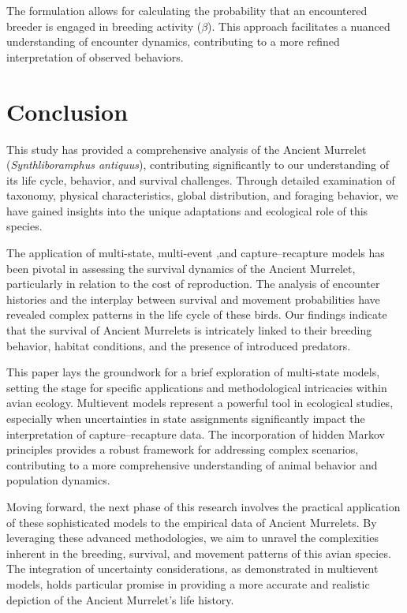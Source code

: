 \documentclass{article}
\begin{document}
The formulation allows for calculating the probability that an encountered breeder is engaged in breeding activity ($\beta$). This approach facilitates a nuanced understanding of encounter dynamics, contributing to a more refined interpretation of observed behaviors.



\section{Conclusion}
This study has provided a comprehensive analysis of the Ancient Murrelet (\textit{Synthliboramphus antiquus}), contributing significantly to our understanding of its life cycle, behavior, and survival challenges. Through detailed examination of taxonomy, physical characteristics, global distribution, and foraging behavior, we have gained insights into the unique adaptations and ecological role of this species.

The application of multi-state, multi-event ,and capture–recapture models has been pivotal in assessing the survival dynamics of the Ancient Murrelet, particularly in relation to the cost of reproduction. The analysis of encounter histories and the interplay between survival and movement probabilities have revealed complex patterns in the life cycle of these birds. Our findings indicate that the survival of Ancient Murrelets is intricately linked to their breeding behavior, habitat conditions, and the presence of introduced predators.

This paper lays the groundwork for a brief exploration of multi-state models, setting the stage for specific applications and methodological intricacies within avian ecology.
Multievent models represent a powerful tool in ecological studies, especially when uncertainties in state assignments significantly impact the interpretation of capture–recapture data. The incorporation of hidden Markov principles provides a robust framework for addressing complex scenarios, contributing to a more comprehensive understanding of animal behavior and population dynamics.

Moving forward, the next phase of this research involves the practical application of these sophisticated models to the empirical data of Ancient Murrelets. By leveraging these advanced methodologies, we aim to unravel the complexities inherent in the breeding, survival, and movement patterns of this avian species. The integration of uncertainty considerations, as demonstrated in multievent models, holds particular promise in providing a more accurate and realistic depiction of the Ancient Murrelet's life history.

	
\end{document}
